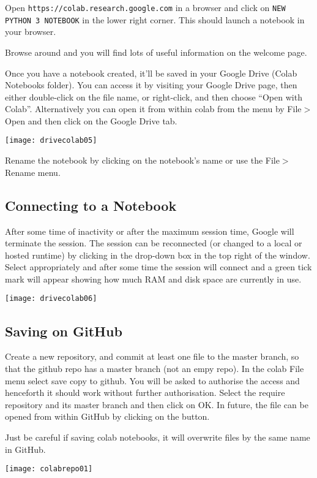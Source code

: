 Open \lstinline{https://colab.research.google.com} in a browser and click on \lstinline{NEW PYTHON 3 NOTEBOOK} in the lower right corner.  This should launch a notebook in your browser. 

Browse around and you will find lots of useful information on the welcome page.

Once you have a notebook created, it'll be saved in your Google Drive (Colab Notebooks folder). You can access it by visiting your Google Drive page, then either double-click on the file name, or right-click, and then choose ``Open with Colab''.  Alternatively you can open it from within colab from the menu by File$>$Open and then click on the Google Drive tab.

\begin{marginfigure}
\texttt{[image: drivecolab05]}
\end{marginfigure}

Rename the notebook by clicking on the notebook's name or use the File$>$Rename menu.

\subsection{Connecting to a Notebook}
After some time of inactivity or after the maximum session time, Google will terminate the session.
The session can be reconnected (or changed to a local or hosted runtime) by clicking in the drop-down box in the top right of the window. Select appropriately and after some time the session will connect and a green tick mark will appear showing how much RAM and disk space are currently in use. 
\begin{marginfigure}
\texttt{[image: drivecolab06]}
\end{marginfigure}


\subsection{Saving on GitHub}

Create a new repository, and commit at least one file to the master branch, so that the github repo has a master branch (not an empy repo).
In the colab File menu select save copy to github.
You will be asked to authorise the access and henceforth it should work without further authorisation.
Select the require repository and its master branch and then click on OK.
In future, the file can be opened from within GitHub by clicking on the button.

Just be careful if saving colab notebooks, it will overwrite files by the same name in GitHub.
\begin{figure*}[h]
\texttt{[image: colabrepo01]}
\end{figure*}


